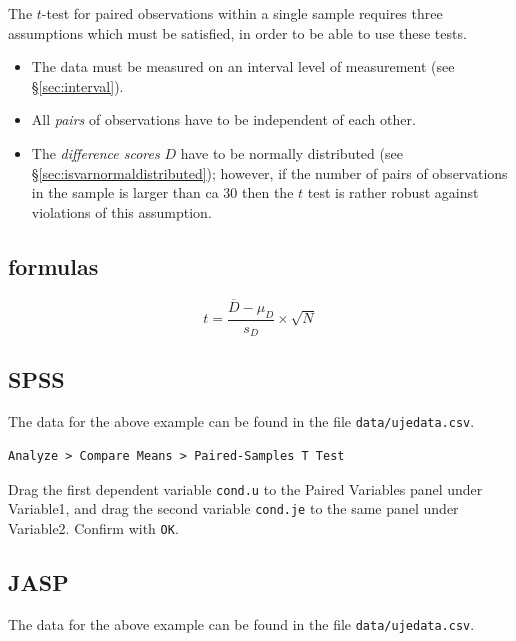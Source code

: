 \documentclass[
]{book}
\begin{document}
The \(t\)-test for paired observations within a single sample requires three
assumptions which must be satisfied, in order to be able to use these
tests.

\begin{itemize}
\item
  The data must be measured on an interval level of measurement (see
  §\ref{sec:interval}).
\item
  All \emph{pairs} of observations have to be independent of
  each other.
\item
  The \emph{difference scores} \(D\) have to be normally distributed (see §\ref{sec:isvarnormaldistributed}); however, if the number of pairs of
  observations in the sample is larger than ca 30 then the \(t\) test is rather robust against violations of this assumption.
\end{itemize}

\hypertarget{sec:formulas13-4}{%
\subsection{formulas}\label{sec:formulas13-4}}

\begin{equation}
  \label{eq:t-pairedsamples}
  t = \frac{ \overline{D}-\mu_D} { s_D } \times \sqrt{N}
\end{equation}

\hypertarget{sec:SPSS-ttest-paired}{%
\subsection{SPSS}\label{sec:SPSS-ttest-paired}}

The data for the above example can be found in the file \texttt{data/ujedata.csv}.

\begin{verbatim}
Analyze > Compare Means > Paired-Samples T Test
\end{verbatim}

Drag the first dependent variable \texttt{cond.u} to the Paired
Variables panel under Variable1, and drag the second variable \texttt{cond.je} to
the same panel under Variable2. Confirm with \texttt{OK}.

\hypertarget{sec:JASP-ttest-paired}{%
\subsection{JASP}\label{sec:JASP-ttest-paired}}

The data for the above example can be found in the file \texttt{data/ujedata.csv}.
\end{document}
